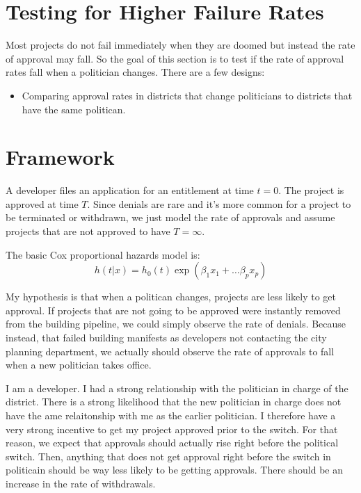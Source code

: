 \documentclass[12pt]{article}
\theoremstyle{definition}
\begin{document}
\section{Testing for Higher Failure Rates}
Most projects do not fail immediately when they are doomed but instead the rate of approval may fall. So the goal of this section is to test if the rate of approval rates fall when a politician changes. There are a few designs:
\begin{itemize}
   \item Comparing approval rates in districts that change politicians to districts that have the same politican. 
\end{itemize}


\section{Framework}
A developer files an application for an entitlement at time $t=0$. The project is approved at time $T$. Since denials are rare and it's more common for a project to be terminated or withdrawn, we just model the rate of approvals and assume projects that are not approved to have $T=\infty$. 

The basic Cox proportional hazards model is:
$$h(t|x) = h_0(t)\exp(\beta_1x_1 + \dots \beta_p x_p)$$

My hypothesis is that when a politican changes, projects are less likely to get approval. If projects that are not going to be approved were instantly removed from the building pipeline, we could simply observe the rate of denials. Because instead, that failed building manifests as developers not contacting the city planning department, we actually should observe the rate of approvals to fall when a new politician takes office. 

I am a developer. I had a strong relationship with the politician in charge of the district. There is a strong likelihood that the new politician in charge does not have the ame relaitonship with me as the earlier politician. I therefore have a very strong incentive to get my project approved prior to the switch. For that reason, we expect that approvals should actually rise right before the political switch. Then, anything that does not get approval right before the switch in politicain should be way less likely to be getting approvals. There should be an increase in the rate of withdrawals. 
\end{document}
